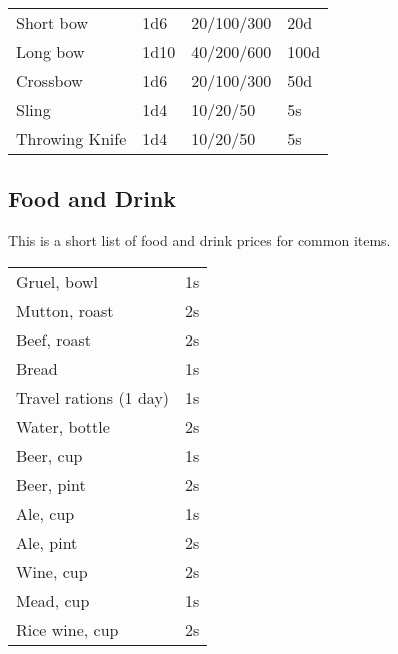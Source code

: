 \begin{center}
{
\begin{xtabular}{|l|l|l|l|}
Short bow & 1d6 & 20/100/300 & 20d \\
Long bow & 1d10 & 40/200/600 & 100d \\
Crossbow & 1d6 & 20/100/300 & 50d \\
Sling & 1d4 & 10/20/50 & 5s \\
Throwing Knife & 1d4 & 10/20/50 & 5s \\
\hline
\end{xtabular}
}
\end{center}

\subsection{Food and Drink}

This is a short list of food and drink prices for common items.

\begin{center}
{
\begin{xtabular}{|l|l|}
Gruel, bowl & 1s \\
Mutton, roast & 2s \\
Beef, roast & 2s \\
Bread & 1s \\
Travel rations (1 day) & 1s \\
Water, bottle & 2s \\
Beer, cup & 1s \\
Beer, pint & 2s \\
Ale, cup & 1s \\
Ale, pint & 2s \\
Wine, cup & 2s \\
Mead, cup & 1s \\
Rice wine, cup & 2s \\
\hline
\end{xtabular}
}
\end{center}

